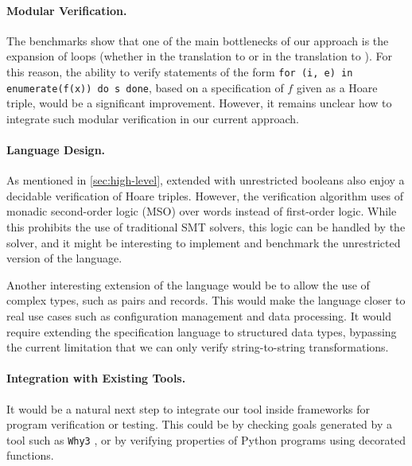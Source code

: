 \paragraph{Modular Verification.} The benchmarks show that one of the main
bottlenecks of our approach is the expansion of loops (whether in the
translation to  or in the translation to
). For this reason, the ability to verify
statements of the form \texttt{for (i, e) in enumerate(f(x)) do s done}, based
on a specification of $f$ given as a Hoare triple, would be a significant
improvement. However, it remains unclear how to integrate such modular
verification in our current approach.

\paragraph{Language Design.} As mentioned in \cref{sec:high-level},
 extended with unrestricted booleans also enjoy a decidable
verification of Hoare triples. However, the verification algorithm uses of
monadic second-order logic (MSO) over words instead of first-order logic. While
this prohibits the use of traditional SMT solvers, this logic can be handled by
the  solver, and it might be interesting to implement and benchmark
the unrestricted version of the language. 

Another interesting extension of the language would be to allow the use of
complex types, such as pairs and records. This would make the language closer
to real use cases such as configuration management and data processing. It
would require extending the specification language to structured data types,
bypassing the current limitation that we can only verify string-to-string
transformations.


\paragraph{Integration with Existing Tools.} It would be a natural next step to
integrate our tool inside frameworks for program verification or testing. This
could be by checking goals generated by a tool such as \texttt{Why3}
\cite{Why3}, or by verifying properties of Python programs using decorated
functions.

